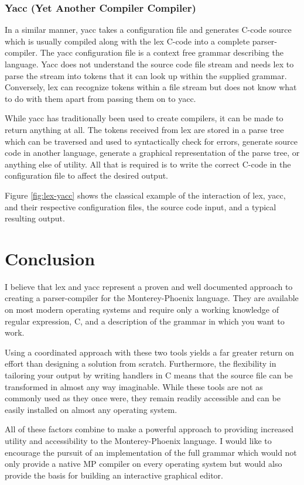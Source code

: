 \documentclass[journal]{IEEEtran}
\begin{document}
\subsubsection{Yacc (Yet Another Compiler Compiler)}
In a similar manner, yacc takes a configuration file and generates C-code source which
is usually compiled along with the lex C-code into a complete parser-compiler.  The yacc 
configuration file is a context free grammar describing the language.  Yacc does not 
understand the source code file stream and needs lex to parse the stream into tokens that
it can look up within the supplied grammar.  Conversely, lex can recognize tokens within a file
stream but does not know what to do with them apart from passing them on to yacc.

While yacc has traditionally been used to create compilers, it can be made to return anything
at all.  The tokens received from lex are stored in a parse tree which can be traversed and
used to syntactically check for errors, generate source code in another language, 
generate a graphical representation of the parse tree, or anything else of utility.  All
that is required is to write the correct C-code in the configuration file to affect the 
desired output.

Figure \ref{fig:lex-yacc} shows the classical example of the interaction of lex, yacc, and
their respective configuration files, the source code input, and a typical resulting output.

\balance
\section{Conclusion}
I believe that lex and yacc represent a proven and well documented approach to creating
a parser-compiler for the Monterey-Phoenix language.  They are available on most 
modern operating systems and require only a working knowledge of regular expression,
C, and a description of the grammar in which you want to work.

Using a coordinated approach with these two tools yields a far greater return on effort than
designing a solution from scratch.  Furthermore, the flexibility in tailoring your output
by writing handlers in C means that the source file can be transformed in almost any 
way imaginable.  While these tools are not as commonly used as they once were, they remain
readily accessible and can be easily installed on almost any operating system.

All of these factors combine to make a powerful approach to providing increased utility and
accessibility to the Monterey-Phoenix language.  I would like to encourage the pursuit of 
an implementation of the full grammar which would not only provide a native MP compiler
on every operating system but would also provide the basis for building an interactive
graphical editor.
\end{document}
